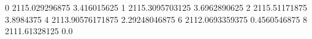 0 2115.029296875 3.416015625
1 2115.3095703125 3.6962890625
2 2115.51171875 3.8984375
4 2113.90576171875 2.29248046875
6 2112.0693359375 0.4560546875
8 2111.61328125 0.0
